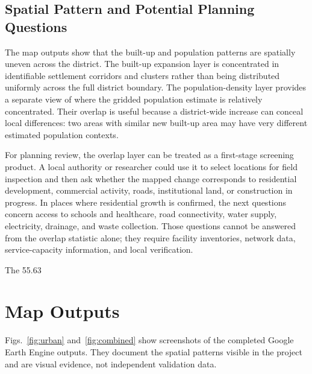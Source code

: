 \documentclass[conference]{IEEEtran}
\begin{document}
\subsection{Spatial Pattern and Potential Planning Questions}
The map outputs show that the built-up and population patterns are spatially uneven across the district. The built-up expansion layer is concentrated in identifiable settlement corridors and clusters rather than being distributed uniformly across the full district boundary. The population-density layer provides a separate view of where the gridded population estimate is relatively concentrated. Their overlap is useful because a district-wide increase can conceal local differences: two areas with similar new built-up area may have very different estimated population contexts.

For planning review, the overlap layer can be treated as a first-stage screening product. A local authority or researcher could use it to select locations for field inspection and then ask whether the mapped change corresponds to residential development, commercial activity, roads, institutional land, or construction in progress. In places where residential growth is confirmed, the next questions concern access to schools and healthcare, road connectivity, water supply, electricity, drainage, and waste collection. Those questions cannot be answered from the overlap statistic alone; they require facility inventories, network data, service-capacity information, and local verification.

The 55.63\\%


\section{Map Outputs}
Figs.~\ref{fig:urban} and~\ref{fig:combined} show screenshots of the completed Google Earth Engine outputs. They document the spatial patterns visible in the project and are visual evidence, not independent validation data.
\end{document}
